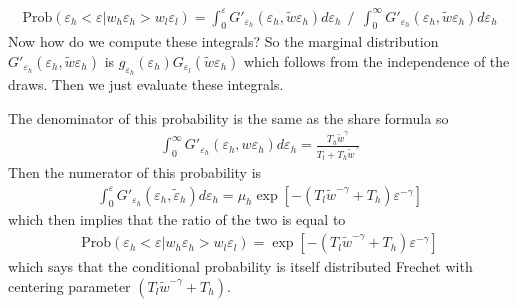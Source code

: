 \documentclass[pdftex,12pt]{article}
\begin{document}
\begin{align}
\displaystyle
\mathrm{Prob}\left( \varepsilon_h < \varepsilon | w_h \varepsilon_h >  w_l\varepsilon_l\right) = \int_0^{\varepsilon}G'_{\varepsilon_h}(\varepsilon_h,\tilde w\varepsilon_h)d\varepsilon_h \ \ \bigg/ \ \ \int_0^{\infty}G'_{\varepsilon_h}(\varepsilon_h,\tilde w\varepsilon_h)d\varepsilon_h
\end{align}
Now how do we compute these integrals? So the marginal distribution $G'_{\varepsilon_h}(\varepsilon_h, \tilde w\varepsilon_h)$ is $g_{\varepsilon_h}(\varepsilon_h)G_{\varepsilon_l}(\tilde w\varepsilon_h)$ which follows from the independence of the draws. Then we just evaluate these integrals.

\medskip
\noindent The denominator of this probability is the same as the share formula so
\begin{align}
\int_0^{\infty}G'_{\varepsilon_h}(\varepsilon_h,w\varepsilon_h)d\varepsilon_h = \frac{T_h \tilde w ^{\gamma}}{T_l + T_h \tilde w ^{\gamma}}
\end{align}
Then the numerator of this probability is
\begin{align}
\int_0^{\varepsilon}G'_{\varepsilon_h}(\varepsilon_h,\tilde \varepsilon_h)d\varepsilon_h = \mu_h \exp\left[-\left(T_l\tilde w ^{-\gamma} + T_h \right)\varepsilon^{-\gamma}\right]
\end{align}
which then implies that the ratio of the two is equal to
\begin{align}
\mathrm{Prob}\left( \varepsilon_h < \varepsilon | w_h \varepsilon_h >  w_l\varepsilon_l\right) = \exp\left[-\left(T_l\tilde w ^{-\gamma} + T_h \right)\varepsilon^{-\gamma}\right]
\end{align}
which says that the conditional probability is itself distributed Frechet with centering parameter $\left(T_l\tilde w ^{-\gamma} + T_h \right)$. 
\end{document}
